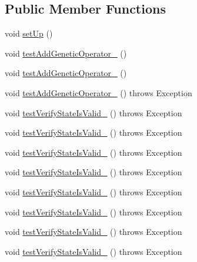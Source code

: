 \subsection*{Public Member Functions}
\begin{DoxyCompactItemize}
\item 
void \hyperlink{classorg_1_1jgap_1_1_configuration_test_a4c0da4e25c41b8cd1b69395c96b9e83a}{set\-Up} ()
\item 
void \hyperlink{classorg_1_1jgap_1_1_configuration_test_a31b75772f99be955b7478748bd728ad0}{test\-Add\-Genetic\-Operator\-\_} ()
\item 
void \hyperlink{classorg_1_1jgap_1_1_configuration_test_abf5f0af7610d0786035c891ae9adb6cf}{test\-Add\-Genetic\-Operator\-\_} ()
\item 
void \hyperlink{classorg_1_1jgap_1_1_configuration_test_aa7b9ff23d28e0db1ff711945ef21e5a6}{test\-Add\-Genetic\-Operator\-\_} ()  throws Exception 
\item 
void \hyperlink{classorg_1_1jgap_1_1_configuration_test_aa3c1750b0025377fa2c28593a2913d55}{test\-Verify\-State\-Is\-Valid\-\_} ()  throws Exception 
\item 
void \hyperlink{classorg_1_1jgap_1_1_configuration_test_a8827a464c60ef61c2beb277c967c0f09}{test\-Verify\-State\-Is\-Valid\-\_} ()  throws Exception 
\item 
void \hyperlink{classorg_1_1jgap_1_1_configuration_test_a5704a3b51ea7f1011f75ffd58190394f}{test\-Verify\-State\-Is\-Valid\-\_} ()  throws Exception 
\item 
void \hyperlink{classorg_1_1jgap_1_1_configuration_test_a630e48d6656c53329e352e8ce461fe59}{test\-Verify\-State\-Is\-Valid\-\_} ()  throws Exception 
\item 
void \hyperlink{classorg_1_1jgap_1_1_configuration_test_a884283bc5814227976e987e6062e2b1b}{test\-Verify\-State\-Is\-Valid\-\_} ()  throws Exception 
\item 
void \hyperlink{classorg_1_1jgap_1_1_configuration_test_a16fe8782a729fc28795009a759b1ba2b}{test\-Verify\-State\-Is\-Valid\-\_} ()  throws Exception 
\item 
void \hyperlink{classorg_1_1jgap_1_1_configuration_test_ae127052cccba823012b70e36c6041e89}{test\-Verify\-State\-Is\-Valid\-\_} ()  throws Exception 
\item 
void \hyperlink{classorg_1_1jgap_1_1_configuration_test_a9be09dab3e5d5c5fa5a67935b057dcd3}{test\-Verify\-State\-Is\-Valid\-\_} ()  throws Exception 
\item 

\end{DoxyCompactItemize}
